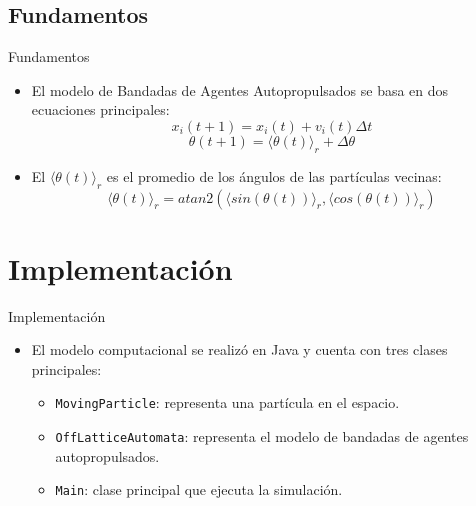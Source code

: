 \documentclass{beamer}
\begin{document}
    \subsection{Fundamentos}

    \begin{frame}{Fundamentos}
        \begin{itemize}
            \item El modelo de Bandadas de Agentes Autopropulsados se basa en dos ecuaciones principales:
                \begin{equation}
                    x_i(t+1) = x_i(t) + v_i(t) \Delta t\label{eq:equation1}
                \end{equation}
                \begin{equation}
                    \theta(t+1) = \langle \theta(t) \rangle_r+ \Delta \theta\label{eq:equation2}
                \end{equation}
            \item El $\langle \theta(t) \rangle_r$ es el promedio de los ángulos de las partículas vecinas:
                \begin{equation}
                    \langle \theta(t) \rangle_r = atan2(\langle sin(\theta(t)) \rangle_r, \langle cos(\theta(t)) \rangle_r)
                \end{equation}
        \end{itemize}
    \end{frame}

    \section{Implementación}

    \begin{frame}{Implementación}
        \begin{itemize}
            \item El modelo computacional se realizó en Java y cuenta con tres clases principales:
            \begin{itemize}
                \item \texttt{MovingParticle}: representa una partícula
                en el espacio.
                \item \texttt{OffLatticeAutomata}: representa el modelo de bandadas de agentes autopropulsados.
                \item \texttt{Main}: clase principal que ejecuta la simulación.
            \end{itemize}
        \end{itemize}
    \end{frame}
\end{document}
